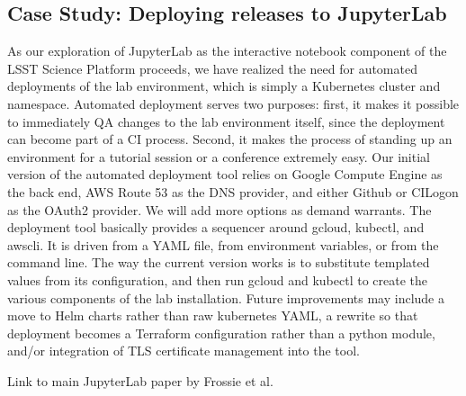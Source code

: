 \subsection{Case Study: Deploying releases to JupyterLab}

As our exploration of JupyterLab as the interactive notebook component
of the LSST Science Platform proceeds, we have realized the need for
automated deployments of the lab environment, which is simply a
Kubernetes cluster and namespace.  Automated deployment serves two
purposes: first, it makes it possible to immediately QA changes to the
lab environment itself, since the deployment can become part of a CI
process.  Second, it makes the process of standing up an environment for
a tutorial session or a conference extremely easy.  Our initial version
of the automated deployment tool relies on Google Compute Engine as the
back end, AWS Route 53 as the DNS provider, and either Github or CILogon
as the OAuth2 provider.  We will add more options as demand warrants.
The deployment tool basically provides a sequencer around gcloud,
kubectl, and awscli.  It is driven from a YAML file, from environment
variables, or from the command line.  The way the current version works
is to substitute templated values from its configuration, and then run
gcloud and kubectl to create the various components of the lab
installation.  Future improvements may include a move to Helm charts
rather than raw kubernetes YAML, a rewrite so that deployment becomes a
Terraform configuration rather than a python module, and/or integration
of TLS certificate management into the tool.



Link to main JupyterLab paper by Frossie et al.
